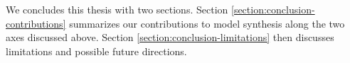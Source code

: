 We concludes this thesis with two sections. Section \ref{section:conclusion-contributions} summarizes our contributions to model synthesis along the two axes discussed above. Section \ref{section:conclusion-limitations} then discusses limitations and possible future directions. 



